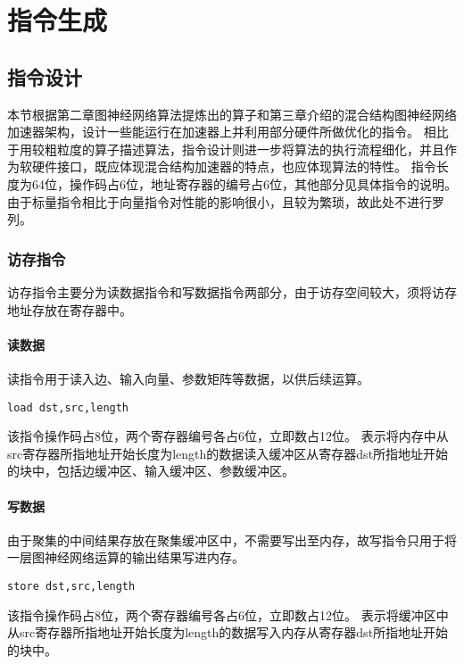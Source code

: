

\chapter{指令生成}

\section{指令设计}
本节根据第二章图神经网络算法提炼出的算子和第三章介绍的混合结构图神经网络加速器架构，设计一些能运行在加速器上并利用部分硬件所做优化的指令。
相比于用较粗粒度的算子描述算法，指令设计则进一步将算法的执行流程细化，并且作为软硬件接口，既应体现混合结构加速器的特点，也应体现算法的特性。
指令长度为64位，操作码占6位，地址寄存器的编号占6位，其他部分见具体指令的说明。
由于标量指令相比于向量指令对性能的影响很小，且较为繁琐，故此处不进行罗列。

\subsection{访存指令}
访存指令主要分为读数据指令和写数据指令两部分，由于访存空间较大，须将访存地址存放在寄存器中。

\subsubsection{读数据}
读指令用于读入边、输入向量、参数矩阵等数据，以供后续运算。
\begin{lstlisting}[language={[x86masm]Assembler}] 
    load dst,src,length
\end{lstlisting}
该指令操作码占8位，两个寄存器编号各占6位，立即数占12位。
表示将内存中从src寄存器所指地址开始长度为length的数据读入缓冲区从寄存器dst所指地址开始的块中，包括边缓冲区、输入缓冲区、参数缓冲区。

\subsubsection{写数据}
由于聚集的中间结果存放在聚集缓冲区中，不需要写出至内存，故写指令只用于将一层图神经网络运算的输出结果写进内存。
\begin{lstlisting}[language={[x86masm]Assembler}] 
    store dst,src,length
\end{lstlisting}
该指令操作码占8位，两个寄存器编号各占6位，立即数占12位。
表示将缓冲区中从src寄存器所指地址开始长度为length的数据写入内存从寄存器dst所指地址开始的块中。


